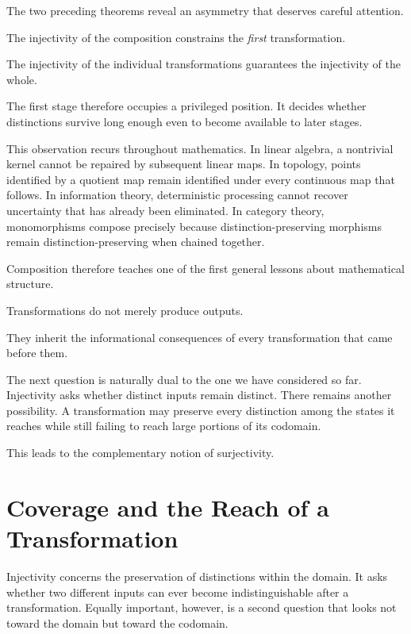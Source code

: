 \documentclass[11pt]{book}
\numberwithin{equation}{chapter}
\theoremstyle{definition}
\theoremstyle{plain}
\theoremstyle{remark}
\begin{document}
The two preceding theorems reveal an asymmetry that deserves careful attention.

The injectivity of the composition constrains the \emph{first} transformation.

The injectivity of the individual transformations guarantees the injectivity of the whole.

The first stage therefore occupies a privileged position. It decides whether distinctions survive long enough even to become available to later stages.

This observation recurs throughout mathematics. In linear algebra, a nontrivial kernel cannot be repaired by subsequent linear maps. In topology, points identified by a quotient map remain identified under every continuous map that follows. In information theory, deterministic processing cannot recover uncertainty that has already been eliminated. In category theory, monomorphisms compose precisely because distinction-preserving morphisms remain distinction-preserving when chained together.

Composition therefore teaches one of the first general lessons about mathematical structure.

Transformations do not merely produce outputs.

They inherit the informational consequences of every transformation that came before them.

The next question is naturally dual to the one we have considered so far. Injectivity asks whether distinct inputs remain distinct. There remains another possibility. A transformation may preserve every distinction among the states it reaches while still failing to reach large portions of its codomain.

This leads to the complementary notion of surjectivity.


\section{Coverage and the Reach of a Transformation}

Injectivity concerns the preservation of distinctions within the domain. It asks whether two different inputs can ever become indistinguishable after a transformation. Equally important, however, is a second question that looks not toward the domain but toward the codomain.
\end{document}
